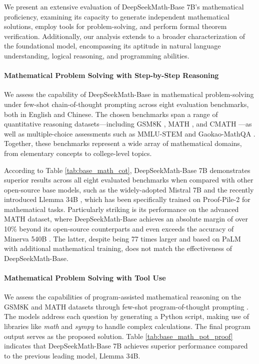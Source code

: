 \begin{itemize}[topsep=0pt]
We present an extensive evaluation of DeepSeekMath-Base 7B’s mathematical proficiency, examining its capacity to generate independent mathematical solutions, employ tools for problem-solving, and perform formal theorem verification. Additionally, our analysis extends to a broader characterization of the foundational model, encompassing its aptitude in natural language understanding, logical reasoning, and programming abilities.

\paragraph{Mathematical Problem Solving with Step-by-Step Reasoning}

We assess the capability of DeepSeekMath-Base in mathematical problem-solving under few-shot chain-of-thought prompting \citep{cot} across eight evaluation benchmarks, both in English and Chinese. The chosen benchmarks span a range of quantitative reasoning datasets—including GSM8K \citep{gsm8k}, MATH \citep{MATH}, and CMATH \citep{wei2023cmath}—as well as multiple-choice assessments such as MMLU-STEM \citep{mmlu} and Gaokao-MathQA \citep{agieval}. Together, these benchmarks represent a wide array of mathematical domains, from elementary concepts to college-level topics.

According to Table \ref{tab:base_math_cot}, DeepSeekMath-Base 7B demonstrates superior results across all eight evaluated benchmarks when compared with other open-source base models, such as the widely-adopted Mistral 7B \citep{mistral} and the recently introduced Llemma 34B \citep{llemma}, which has been specifically trained on Proof-Pile-2 \citep{llemma} for mathematical tasks. Particularly striking is its performance on the advanced MATH dataset, where DeepSeekMath-Base achieves an absolute margin of over 10\% beyond its open-source counterparts and even exceeds the accuracy of Minerva 540B \citep{minerva}. The latter, despite being 77 times larger and based on PaLM \citep{palm} with additional mathematical training, does not match the effectiveness of DeepSeekMath-Base.

\paragraph{Mathematical Problem Solving with Tool Use} We assess the capabilities of program-assisted mathematical reasoning on the GSM8K and MATH datasets through few-shot program-of-thought prompting \citep{pot,pal}. The models address each question by generating a Python script, making use of libraries like \textit{math} and \textit{sympy} to handle complex calculations. The final program output serves as the proposed solution. Table \ref{tab:base_math_pot_proof} indicates that DeepSeekMath-Base 7B achieves superior performance compared to the previous leading model, Llemma 34B.


\end{itemize}
